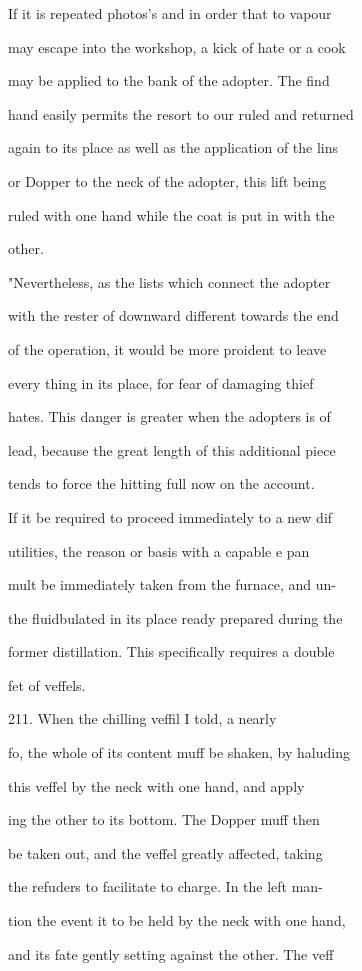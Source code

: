 \documentclass{article}
\begin{document}
If it is repeated photos’s and in order that to vapour

may escape into the workshop, a kick of hate or a cook

may be applied to the bank of the adopter. The find

hand easily permits the resort to our ruled and returned

again to its place as well as the application of the lins

or Dopper to the neck of the adopter, this lift being

ruled with one hand while the coat is put in with the

other.

"Nevertheless, as the lists which connect the adopter

with the rester of downward different towards the end

of the operation, it would be more proident to leave

every thing in its place, for fear of damaging thief

hates. This danger is greater when the adopters is of

lead, because the great length of this additional piece

tends to force the hitting full now on the account.

If it be required to proceed immediately to a new dif

utilities, the reason or basis with a capable e pan

mult be immediately taken from the furnace, and un-

the fluidbulated in its place ready prepared during the

former distillation. This specifically requires a double

fet of veffels.

211. When the chilling veffil I told, a nearly

fo, the whole of its content muff be shaken, by haluding

this veffel by the neck with one hand, and apply

ing the other to its bottom. The Dopper muff then

be taken out, and the veffel greatly affected, taking

the refuders to facilitate to charge. In the left man-

tion the event it to be held by the neck with one hand,

and its fate gently setting against the other. The veff
\end{document}
